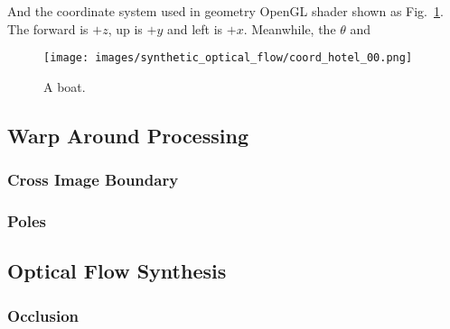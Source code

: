 And the coordinate system used in geometry OpenGL shader shown as Fig.~\ref{fig:approach:geometry_cs}.
The forward is $+z$, up is $+y$ and left is $+x$.
Meanwhile, the $\theta$ and $$

\begin{figure}[hbt!]
	\centering
	\texttt{[image: images/synthetic\_optical\_flow/coord\_hotel\_00.png]}
	\caption{A boat.}
	\label{fig:approach:geometry_cs}
\end{figure}


\subsection{Warp Around Processing}




\subsubsection{Cross Image Boundary}


\subsubsection{Poles}


\subsection{Optical Flow Synthesis}



\subsubsection{Occlusion}


